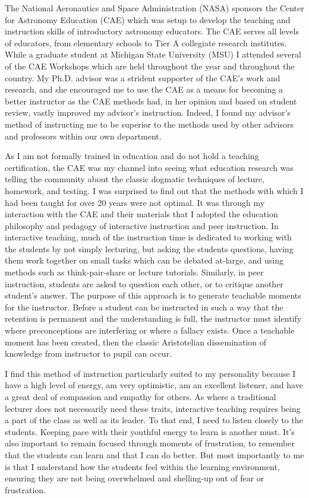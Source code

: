 \documentclass[11pt]{article}
\begin{document}
The National Aeronautics and Space Administration (NASA) sponsors the
Center for Astronomy Education (CAE) which was setup to develop the
teaching and instruction skills of introductory astronomy
educators. The CAE serves all levels of educators, from elementary
schools to Tier A collegiate research institutes. While a graduate
student at Michigan State University (MSU) I attended several of the
CAE Workshops which are held throughout the year and throughout the
country. My Ph.D. advisor was a strident supporter of the CAE's work
and research, and she encouraged me to use the CAE as a means for
becoming a better instructor as the CAE methods had, in her opinion
and based on student review, vastly improved my advisor's
instruction. Indeed, I found my advisor's method of instructing me to
be superior to the methods used by other advisors and professors
within our own department.

As I am not formally trained in education and do not hold a teaching
certification, the CAE was my channel into seeing what education
research was telling the community about the classic dogmatic
techniques of lecture, homework, and testing. I was surprised to find
out that the methods with which I had been taught for over 20 years
were not optimal. It was through my interaction with the CAE and their
materials that I adopted the education philosophy and pedagogy of
interactive instruction and peer instruction. In interactive teaching,
much of the instruction time is dedicated to working with the students
by not simply lecturing, but asking the students questions, having
them work together on small tasks which can be debated at-large, and
using methods such as think-pair-share or lecture
tutorials. Similarly, in peer instruction, students are asked to
question each other, or to critique another student's answer. The
purpose of this approach is to generate teachable moments for the
instructor. Before a student can be instructed in such a way that the
retention is permanent and the understanding is full, the instructor
must identify where preconceptions are interfering or where a fallacy
exists. Once a teachable moment has been created, then the classic
Aristotelian dissemination of knowledge from instructor to pupil can
occur.

I find this method of instruction particularly suited to my
personality because I have a high level of energy, am very optimistic,
am an excellent listener, and have a great deal of compassion and
empathy for others. As where a traditional lecturer does not
necessarily need these traits, interactive teaching requires being a
part of the class as well as its leader. To that end, I need to listen
closely to the students. Keeping pace with their youthful energy to
learn is another must. It's also important to remain focused through
moments of frustration, to remember that the students can learn and
that I can do better. But most importantly to me is that I understand
how the students feel within the learning environment, ensuring they
are not being overwhelmed and shelling-up out of fear or frustration.
\end{document}
